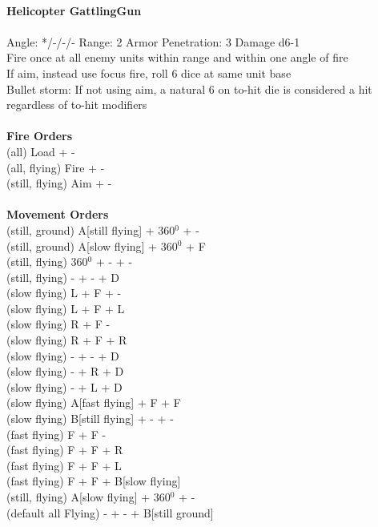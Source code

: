 \ \\
{\bf Helicopter GattlingGun } \\
\ \\
Angle: */-/-/- Range: 2 Armor Penetration: 3 Damage d6-1 \\
\indent Fire once at all enemy units within range and within one angle of fire \\ If aim, instead use focus fire, roll 6 dice at same unit base\\ Bullet storm: If not using aim, a natural 6 on to-hit die is considered a hit regardless of to-hit modifiers \\





\ \\ {\bf Fire Orders } \\
(all) Load + - \\
(all, flying) Fire + - \\
(still, flying) Aim + - \\
\ \\ {\bf Movement Orders } \\
(still, ground) A[still flying] + 360$^0$ + -  \\
(still, ground) A[slow flying] + 360$^0$ + F  \\
(still, flying) 360$^0$ + - + -   \\
(still, flying) - + - + D \\
(slow flying)  L + F + -  \\
(slow flying)  L + F + L  \\
(slow flying)  R + F -  \\
(slow flying)  R + F + R  \\
(slow flying)  - + - + D  \\
(slow flying)  - + R + D  \\
(slow flying)  - + L + D  \\
(slow flying)  A[fast flying] + F + F  \\
(slow flying)  B[still flying] + - + -  \\
(fast flying)  F + F -  \\
(fast flying)  F + F + R  \\
(fast flying)  F + F + L  \\
(fast flying)  F + F + B[slow flying]  \\
(still, flying) A[slow flying] + 360$^0$ + -  \\
(default all Flying) - + - + B[still ground] \\



